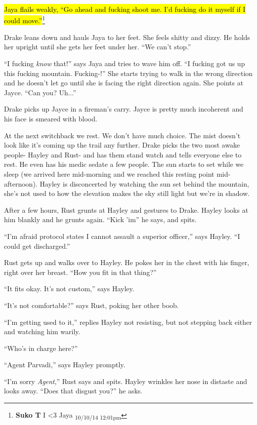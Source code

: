 \hl{Jaya flails weakly, ``Go ahead and fucking shoot me.  I'd fucking do it myself if I could move.''}\footnote{\textbf{Suko T }I \textless 3 Jaya \textsubscript{10/10/14 12:01pm}}

Drake leans down and hauls Jaya to her feet.  She feels shitty and dizzy.  He holds her upright until she gets her feet under her.  ``We can't stop.''

``I fucking \textit{know} that!'' says Jaya and tries to wave him off.  ``I fucking got us up this fucking mountain.  Fucking-!''  She starts trying to walk in the wrong direction and he doesn't let go until she is facing the right direction again.  She points at Jayce.  ``Can you? Uh...''

Drake picks up Jayce in a fireman's carry.  Jayce is pretty much incoherent and his face is smeared with blood.  



At the next switchback we rest.   We don't have much choice.  The mist doesn't look like it's coming up the trail any further.  Drake picks the two most awake people- Hayley and Rust- and has them stand watch and tells everyone else to rest.  He even has his medic sedate a few people.  The sun starts to set while we sleep (we arrived here mid-morning and we reached this resting point mid-afternoon).  Hayley is disconcerted by watching the sun set behind the mountain, she's not used to how the elevation makes the sky still light but we're in shadow.  



After a few hours, Rust grunts at Hayley and gestures to Drake.   Hayley looks at him blankly and he grunts again.  ``Kick 'im'' he says, and spits.

``I'm afraid protocol states I cannot assault a superior officer,'' says Hayley.  ``I could get discharged.''

Rust gets up and walks over to Hayley.  He pokes her in the chest with his finger, right over her breast.  ``How you fit in that thing?''

``It fits okay.  It's not custom,'' says Hayley.

``It's not comfortable?'' says Rust, poking her other boob.

``I'm getting used to it,'' replies Hayley not resisting, but not stepping back either and watching him warily.

``Who's in charge here?''

``Agent Parvadi,'' says Hayley promptly.

``I'm sorry \textit{Agent},'' Rust says and spits.  Hayley wrinkles her nose in distaste and looks away.  ``Does that disgust you?'' he asks.

